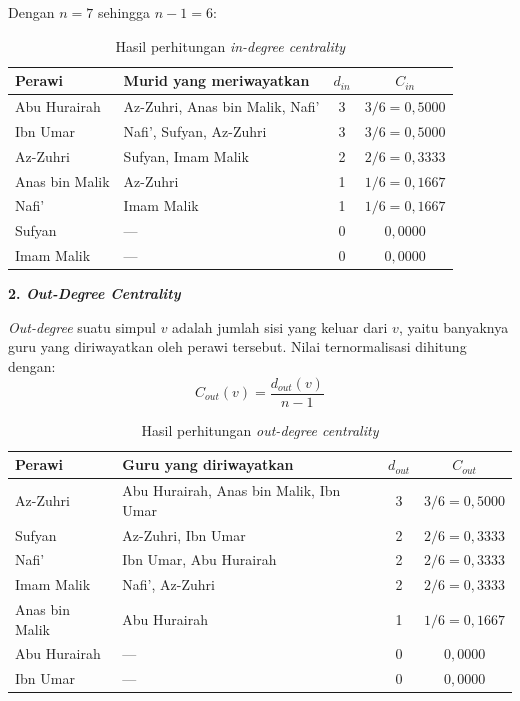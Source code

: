 \noindent Dengan $n = 7$ sehingga $n - 1 = 6$:

\begin{table}[H]
\centering
\caption{Hasil perhitungan \textit{in-degree centrality}}
\label{lamp:tab:indegree}
\begin{tabular}{|l|l|c|c|}
\hline
\textbf{Perawi} & \textbf{Murid yang meriwayatkan} & $d_{in}$ & $C_{in}$ \\
\hline
Abu Hurairah    & Az-Zuhri, Anas bin Malik, Nafi'  & 3 & $3/6 = 0{,}5000$ \\
Ibn Umar        & Nafi', Sufyan, Az-Zuhri          & 3 & $3/6 = 0{,}5000$ \\
Az-Zuhri        & Sufyan, Imam Malik                & 2 & $2/6 = 0{,}3333$ \\
Anas bin Malik  & Az-Zuhri                          & 1 & $1/6 = 0{,}1667$ \\
Nafi'           & Imam Malik                        & 1 & $1/6 = 0{,}1667$ \\
Sufyan          & ---                               & 0 & $0{,}0000$ \\
Imam Malik      & ---                               & 0 & $0{,}0000$ \\
\hline
\end{tabular}
\end{table}

\vspace{0.3cm}
\noindent\textbf{2. \textit{Out-Degree Centrality}}

\vspace{0.2cm}
\noindent \textit{Out-degree} suatu simpul $v$ adalah jumlah sisi yang keluar dari $v$, yaitu banyaknya guru yang diriwayatkan oleh perawi tersebut. Nilai ternormalisasi dihitung dengan:
$$C_{out}(v) = \frac{d_{out}(v)}{n - 1}$$

\begin{table}[H]
\centering
\caption{Hasil perhitungan \textit{out-degree centrality}}
\label{lamp:tab:outdegree}
\begin{tabular}{|l|l|c|c|}
\hline
\textbf{Perawi} & \textbf{Guru yang diriwayatkan} & $d_{out}$ & $C_{out}$ \\
\hline
Az-Zuhri        & Abu Hurairah, Anas bin Malik, Ibn Umar & 3 & $3/6 = 0{,}5000$ \\
Sufyan          & Az-Zuhri, Ibn Umar                     & 2 & $2/6 = 0{,}3333$ \\
Nafi'           & Ibn Umar, Abu Hurairah                 & 2 & $2/6 = 0{,}3333$ \\
Imam Malik      & Nafi', Az-Zuhri                        & 2 & $2/6 = 0{,}3333$ \\
Anas bin Malik  & Abu Hurairah                           & 1 & $1/6 = 0{,}1667$ \\
Abu Hurairah    & ---                                    & 0 & $0{,}0000$ \\
Ibn Umar        & ---                                    & 0 & $0{,}0000$ \\
\hline
\end{tabular}
\end{table}

